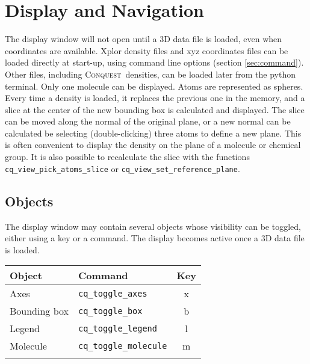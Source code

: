 \documentclass[a4paper,notitlepage,11pt]{article}
\def\CQ{\textsc{Conquest}}
\begin{document}
\section{Display and Navigation}
\label{sec:navigation}

The display window will not open until a 3D data file is loaded, even when coordinates
are available. Xplor density  files and xyz  coordinates files can be loaded directly at start-up, using
command line options (section \ref{sec:command}). Other files, including \CQ\
densities, can be loaded later from the python terminal. Only one molecule can be displayed. Atoms are represented as spheres. 
Every time a density is loaded, it replaces the previous one in the memory, and a slice\index{Density Slice} at the
center of the new bounding box is calculated and displayed. The slice can be moved along the normal
of the original plane, or a new normal can be calculated be selecting 
(double-clicking) three atoms to define a new plane.
This is often convenient to display the density on the plane of a molecule or chemical group.
It is also possible to recalculate the slice with the functions \texttt{cq\_view\_pick\_atoms\_slice} or
\texttt{cq\_view\_set\_reference\_plane}.

\subsection{Objects}
\label{sec:objects}

The display window may contain several objects whose visibility can be toggled,
either using a key or a command. The display becomes active once a 3D data file is loaded.

\begin{tabular}{llc}
\\
\hline \hline
Object&Command&Key\\
\hline
Axes&\texttt{cq\_toggle\_axes}&x\\
Bounding box&\texttt{cq\_toggle\_box}&b\\
Legend&\texttt{cq\_toggle\_legend}&l\\
Molecule&\texttt{cq\_toggle\_molecule}&m\\
\hline \hline
\\
\end{tabular}
\end{document}
